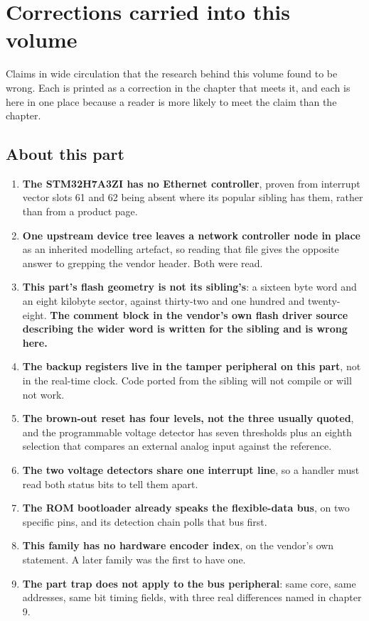 \section{Corrections carried into this volume}

Claims in wide circulation that the research behind this volume found to be
wrong. Each is printed as a correction in the chapter that meets it, and each is
here in one place because a reader is more likely to meet the claim than the
chapter.

\subsection*{About this part}

\begin{enumerate}[itemsep=2pt]
\item \textbf{The STM32H7A3ZI has no Ethernet controller}, proven from interrupt
vector slots 61 and 62 being absent where its popular sibling has them, rather
than from a product page.
\item \textbf{One upstream device tree leaves a network controller node in
place} as an inherited modelling artefact, so reading that file gives the
opposite answer to grepping the vendor header. Both were read.
\item \textbf{This part's flash geometry is not its sibling's}: a sixteen byte
word and an eight kilobyte sector, against thirty-two and one hundred and
twenty-eight. \textbf{The comment block in the vendor's own flash driver source
describing the wider word is written for the sibling and is wrong here.}
\item \textbf{The backup registers live in the tamper peripheral on this part},
not in the real-time clock. Code ported from the sibling will not compile or
will not work.
\item \textbf{The brown-out reset has four levels, not the three usually
quoted}, and the programmable voltage detector has seven thresholds plus an
eighth selection that compares an external analog input against the reference.
\item \textbf{The two voltage detectors share one interrupt line}, so a handler
must read both status bits to tell them apart.
\item \textbf{The ROM bootloader already speaks the flexible-data bus}, on two
specific pins, and its detection chain polls that bus first.
\item \textbf{This family has no hardware encoder index}, on the vendor's own
statement. A later family was the first to have one.
\item \textbf{The part trap does not apply to the bus peripheral}: same core,
same addresses, same bit timing fields, with three real differences named in
chapter 9.
\end{enumerate}

